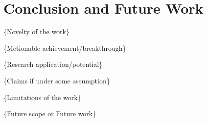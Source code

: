 \section{Conclusion and Future Work}
\label{sec:conclusion}

\{Novelty of the work\}

\{Metionable achievement/breakthrough\}


\{Research application/potential\}

    
\{Claims if under some assumption\}
    
\{Limitations of the work\}
    
\{Future scope or Future work\}


